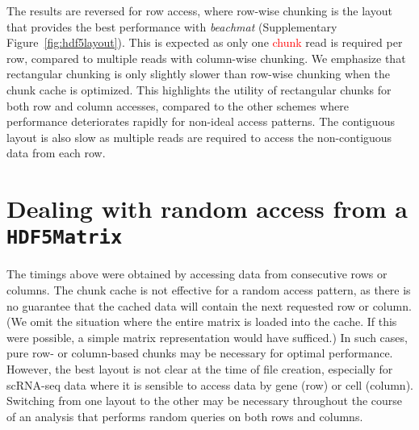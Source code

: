 \documentclass{article}
\newcommand{\beachmat}{\textit{beachmat}}
\newcommand{\revised}[1]{\textcolor{red}{#1}}
\begin{document}
The results are reversed for row access, where row-wise chunking is the layout that provides the best performance with \beachmat{} (Supplementary Figure~\ref{fig:hdf5layout}).
This is expected as only one \revised{chunk} read is required per row, compared to multiple reads with column-wise chunking.
We emphasize that rectangular chunking is only slightly slower than row-wise chunking when the chunk cache is optimized.
This highlights the utility of rectangular chunks for both row and column accesses, compared to the other schemes where performance deteriorates rapidly for non-ideal access patterns.
The contiguous layout is also slow as multiple reads are required to access the non-contiguous data from each row.

\section{Dealing with random access from a \texttt{HDF5Matrix}}
\label{sec:random}

The timings above were obtained by accessing data from consecutive rows or columns.
The chunk cache is not effective for a random access pattern, as there is no guarantee that the cached data will contain the next requested row or column.
(We omit the situation where the entire matrix is loaded into the cache.
If this were possible, a simple matrix representation would have sufficed.)
In such cases, pure row- or column-based chunks may be necessary for optimal performance.
However, the best layout is not clear at the time of file creation, especially for scRNA-seq data where it is sensible to access data by gene (row) or cell (column).
Switching from one layout to the other may be necessary throughout the course of an analysis that performs random queries on both rows and columns.
\end{document}

